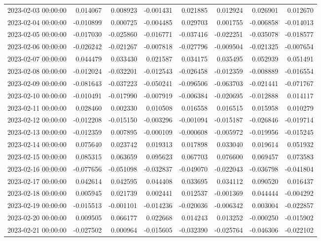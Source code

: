 \begin{tabular}{lrrrrrrr}
2023-02-03 00:00:00 & 0.014067 & 0.008923 & -0.001431 & 0.021885 & 0.012924 & 0.026901 & 0.012670 \\
2023-02-04 00:00:00 & -0.010899 & 0.000725 & -0.004485 & 0.029703 & 0.001755 & -0.006858 & -0.014013 \\
2023-02-05 00:00:00 & -0.017030 & -0.025860 & -0.016771 & -0.037416 & -0.022251 & -0.035078 & -0.018577 \\
2023-02-06 00:00:00 & -0.026242 & -0.021267 & -0.007818 & -0.027796 & -0.009504 & -0.021325 & -0.007654 \\
2023-02-07 00:00:00 & 0.044479 & 0.033430 & 0.021587 & 0.034175 & 0.035495 & 0.052939 & 0.051491 \\
2023-02-08 00:00:00 & -0.012024 & -0.032201 & -0.012543 & -0.026458 & -0.012359 & -0.008889 & -0.016554 \\
2023-02-09 00:00:00 & -0.081643 & -0.037223 & -0.050241 & -0.096506 & -0.063703 & -0.021441 & -0.071767 \\
2023-02-10 00:00:00 & -0.010491 & -0.017990 & -0.007919 & -0.006384 & -0.020695 & -0.012888 & 0.014117 \\
2023-02-11 00:00:00 & 0.028460 & 0.002330 & 0.010508 & 0.016558 & 0.016515 & 0.015958 & 0.010279 \\
2023-02-12 00:00:00 & -0.012208 & -0.015150 & -0.003296 & -0.001094 & -0.015187 & -0.026846 & -0.019714 \\
2023-02-13 00:00:00 & -0.012359 & 0.007895 & -0.000109 & -0.000608 & -0.005972 & -0.019956 & -0.015245 \\
2023-02-14 00:00:00 & 0.075640 & 0.023742 & 0.019313 & 0.017898 & 0.033040 & 0.019614 & 0.051932 \\
2023-02-15 00:00:00 & 0.085315 & 0.063659 & 0.095623 & 0.067703 & 0.076600 & 0.069457 & 0.073583 \\
2023-02-16 00:00:00 & -0.077656 & -0.051098 & -0.032837 & -0.049070 & -0.022043 & -0.036798 & -0.041804 \\
2023-02-17 00:00:00 & 0.042614 & 0.042595 & 0.044408 & 0.033695 & 0.034112 & 0.090520 & 0.016437 \\
2023-02-18 00:00:00 & 0.005945 & 0.021739 & 0.002441 & 0.012537 & -0.001369 & 0.044444 & -0.004292 \\
2023-02-19 00:00:00 & -0.015513 & -0.001101 & -0.014236 & -0.020036 & -0.006342 & 0.003004 & -0.022857 \\
2023-02-20 00:00:00 & 0.009505 & 0.066177 & 0.022668 & 0.014243 & 0.013252 & -0.000250 & -0.015902 \\
2023-02-21 00:00:00 & -0.027502 & 0.000964 & -0.015605 & -0.032390 & -0.025764 & -0.046306 & -0.022102 \\

\end{tabular}
